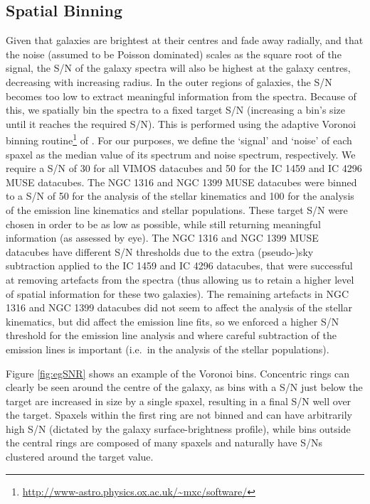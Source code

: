 	\subsection{Spatial Binning}
		\label{subsec:Binning}
		Given that galaxies are brightest at their centres and fade away radially, and that the noise (assumed to be Poisson dominated) scales as the square root of the signal, the S/N of the galaxy spectra will also be highest at the galaxy centres, decreasing with increasing radius. In the outer regions of galaxies, the S/N becomes too low to extract meaningful information from the spectra. Because of this, we spatially bin the spectra to a fixed target S/N (increasing a bin's size until it reaches the required S/N). This is performed using the adaptive Voronoi binning routine\footnote{\url{http://www-astro.physics.ox.ac.uk/~mxc/software/}} of \citet{Cappellari2003}. For our purposes, we define the `signal' and `noise' of each spaxel as the median value of its spectrum and noise spectrum, respectively. We require a S/N of 30 for all VIMOS datacubes and 50 for the IC 1459 and IC 4296 MUSE datacubes. The NGC 1316 and NGC 1399 MUSE datacubes were binned to a S/N of 50 for the analysis of the stellar kinematics and 100 for the analysis of the emission line kinematics and stellar populations. These target S/N were chosen in order to be as low as possible, while still returning meaningful information (as assessed by eye). The NGC 1316 and NGC 1399 MUSE datacubes have different S/N thresholds due to the extra (pseudo-)sky subtraction applied to the IC 1459 and IC 4296 datacubes, that were successful at removing artefacts from the spectra (thus allowing us to retain a higher level of spatial information for these two galaxies). The remaining artefacts in NGC 1316 and NGC 1399 datacubes did not seem to affect the analysis of the stellar kinematics, but did affect the emission line fits, so we enforced a higher S/N threshold for the emission line analysis and where careful subtraction of the emission lines is important (i.e.\ in the analysis of the stellar populations). 

		Figure \ref{fig:egSNR} shows an example of the Voronoi bins. Concentric rings can clearly be seen around the centre of the galaxy, as bins with a S/N just below the target are increased in size by a single spaxel, resulting in a final S/N well over the target. Spaxels within the first ring are not binned and can have arbitrarily high S/N (dictated by the galaxy surface-brightness profile), while bins outside the central rings are composed of many spaxels and naturally have S/Ns clustered around the target value.

